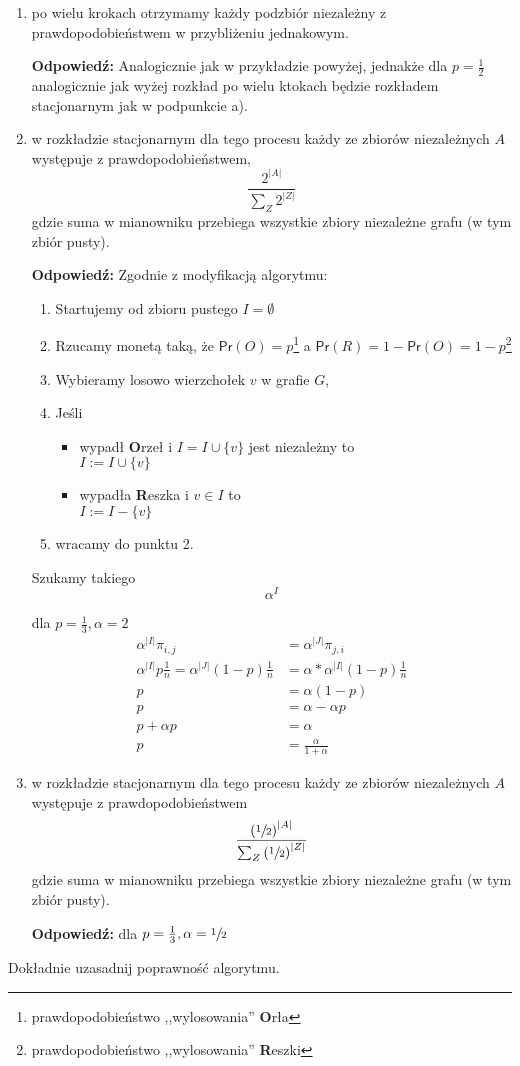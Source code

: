 \begin{enumerate}[label=\alph*)]
\item po wielu krokach otrzymamy każdy podzbiór niezależny z prawdopodobieństwem w przybliżeniu jednakowym.

\textbf{Odpowiedź: }Analogicznie jak w przykładzie powyżej, jednakże dla $p= \frac{1}{2}$ analogicznie jak wyżej rozkład po wielu ktokach będzie rozkładem stacjonarnym jak w podpunkcie a).
\item w rozkładzie stacjonarnym dla tego procesu każdy ze zbiorów niezależnych $A$ występuje z prawdopodobieństwem, 
$$\frac{2^{|A|}}{\sum _Z2^{|Z|}}$$
gdzie suma w mianowniku przebiega wszystkie zbiory niezależne grafu (w tym zbiór pusty).

\textbf{Odpowiedź: } Zgodnie z modyfikacją algorytmu: 
\begin{enumerate}[label=\arabic*.]
\item Startujemy od zbioru pustego $I=\emptyset $
\item Rzucamy monetą taką, że $\mathsf{Pr}(O)=p$\footnote{prawdopodobieństwo ,,wylosowania'' \textbf{O}rła} a $\mathsf{Pr}(R)=1-\mathsf{Pr}(O)=1-p$\footnote{prawdopodobieństwo ,,wylosowania'' \textbf{R}eszki}
\item Wybieramy losowo wierzchołek $v$ w grafie $G$,
\item Jeśli 
\begin{itemize}
\item[] wypadł \textbf{O}rzeł i $I=I\cup \{v\}$ jest niezależny to\\
$I:=I\cup \{v\}$
\item[] wypadła \textbf{R}eszka i $v\in I$ to\\
$I:=I- \{v\}$
\end{itemize}
\item wracamy do punktu 2.
\end{enumerate}

Szukamy takiego $$\alpha ^I$$


dla $p=\frac{1}{3}, \alpha =2$ 
\begin{align*}
\alpha ^{|I|}\pi_{i,j}&=\alpha ^{|J|}\pi_{j,i}\\
\alpha ^{|I|}p\frac{1}{n}=\alpha ^{|J|}(1-p)\frac{1}{n}&=\alpha *\alpha ^{|I|}(1-p)\frac{1}{n}\\
p&=\alpha (1-p)\\
p&=\alpha -\alpha p\\
p+\alpha p&=\alpha\\
p&=\frac{\alpha}{1+\alpha}
\end{align*}


\item w rozkładzie stacjonarnym dla tego procesu każdy ze zbiorów niezależnych $A$ występuje z prawdopodobieństwem $$\frac{\left(\sfrac{1}{2}\right)^{|A|}}{\sum _Z \left(\sfrac{1}{2}\right)^{|Z|}}$$
gdzie suma w mianowniku przebiega wszystkie zbiory niezależne grafu (w tym zbiór pusty).

\textbf{Odpowiedź: }dla $p=\frac{1}{3}, \alpha =\sfrac{1}{2}$ 
\end{enumerate}
Dokładnie uzasadnij poprawność algorytmu.

